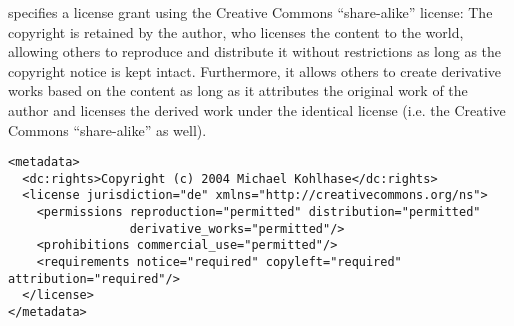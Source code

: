 \begin{module}[id=cc]
\begin{omgroup}[id=creativecommons,short=Managing Rights]
{} specifies a license grant using the Creative Commons
``share-alike'' license: The copyright is retained by the author, who licenses the content
to the world, allowing others to reproduce and distribute it without restrictions as long
as the copyright notice is kept intact. Furthermore, it allows others to create derivative
works based on the content as long as it attributes the original work of the author and
licenses the derived work under the identical license (i.e. the Creative Commons
``share-alike'' as well).
\begin{lstlisting}[label=lst:ccc-copyleft,caption={A Creative Commons License},
  index={metadata,dc:rights,license,permissions,reproduction,distribution,
%         derivative_works,commercial_use,
         notice,copyleft,attribution,prohibitions,requirements}]
<metadata>
  <dc:rights>Copyright (c) 2004 Michael Kohlhase</dc:rights>
  <license jurisdiction="de" xmlns="http://creativecommons.org/ns">
    <permissions reproduction="permitted" distribution="permitted" 
                 derivative_works="permitted"/>
    <prohibitions commercial_use="permitted"/>
    <requirements notice="required" copyleft="required" attribution="required"/>
  </license>
</metadata>
\end{lstlisting}
\end{omgroup}
\end{module}


